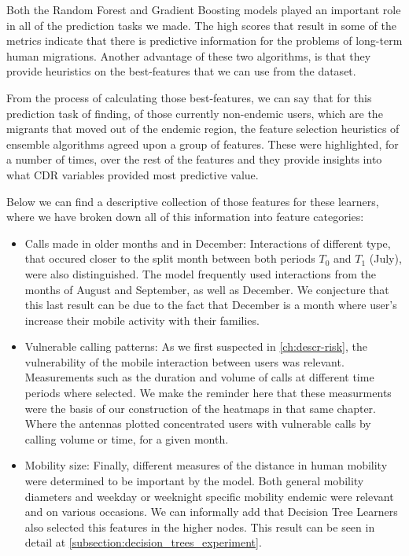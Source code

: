 
Both the Random Forest and Gradient Boosting models played an important role in all of the prediction tasks we made.
The high scores that result in some of the metrics indicate that there is predictive information for the problems of long-term human migrations.
Another advantage of these two algorithms, is that they provide heuristics on the best-features that we can use from the dataset.

From the process of calculating those best-features, we can say that for this prediction task of finding, of those currently non-endemic users, which are the migrants that moved out of the endemic region, the feature selection heuristics of ensemble algorithms agreed upon a group of features.
These were highlighted, for a number of times, over the rest of the features and they provide insights into what CDR variables provided most predictive value.

Below we can find a descriptive collection of those features for these learners, where we have broken down all of this information into feature categories:

\begin{itemize}

    \item Calls made in older months and in December: Interactions of different type, that occured closer to the split month between both periods $T_0$ and $T_1$ (July), were also distinguished.
    The model frequently used interactions from the months of August and September, as well as December.
    We conjecture that this last result can be due to the fact that December is a month where user's increase their mobile activity with their families.

    \item Vulnerable calling patterns: As we first suspected in \cref{ch:descr-risk}, the vulnerability of the mobile interaction between users was relevant.
    Measurements such as the duration and volume of calls at different time periods where selected.
    We make the reminder here that these measurments were the basis of our construction of the heatmaps in that same chapter.
    Where the antennas plotted concentrated users with vulnerable calls by calling volume or time, for a given month.

    \item Mobility size: Finally, different measures of the distance in human mobility were determined to be important by the model. Both general mobility diameters and weekday or weeknight specific mobility endemic were relevant and on various occasions.
    We can informally add that Decision Tree Learners also selected this features in the higher nodes.
    This result can be seen in detail at \cref{subsection:decision_trees_experiment}.

\end{itemize}

